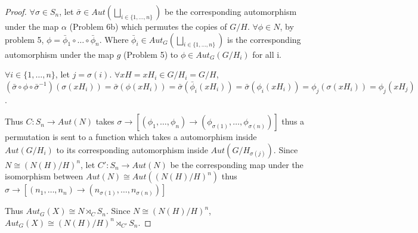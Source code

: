 \documentclass{article}
\begin{document}
\begin{proof}
    $\forall \sigma \in S_n$, let $\bar \sigma \in Aut(\bigsqcup_{i \in \{1, \ldots, n\}})$ be the corresponding automorphism under the map $\alpha$ (Problem 6b) which permutes the copies of $G/H$. $\forall \phi \in N$, by problem 5, $\phi = \bar \phi_1 \circ \ldots \circ \bar \phi_n$. Where $\bar \phi_i \in Aut_G(\bigsqcup_{i \in \{1, \ldots, n\}})$ is the corresponding automorphism under the map $g$ (Problem 5) to $\phi \in Aut_G(G/H_i)$ for all i.
    
    $\forall i \in \{1, \ldots, n\}$, let $j = \sigma(i)$. $\forall xH = xH_i \in G/H_i = G/H$, $(\bar \sigma \circ \phi \circ \bar \sigma^{-1})(\sigma(xH_i)) = \bar \sigma(\phi(xH_i)) = \bar \sigma(\bar \phi_i(xH_i)) = \bar \sigma(\phi_i(xH_i)) = \phi_j(\sigma(xH_i)) = \phi_j(xH_j)$.

    Thus $C: S_n \to Aut(N)$ takes $\sigma \to [(\phi_1, \ldots, \phi_n) \to (\phi_{\sigma(1)}, \ldots, \phi_{\sigma(n)})]$ thus a permutation is sent to a function which takes a automorphism inside $Aut(G/H_i)$ to its corresponding automorphism inside $Aut(G/H_{\sigma(j)})$. Since $N \cong (N(H)/H)^n$, let $C' : S_n \to Aut(N)$ be the corresponding map under the isomorphism between $Aut(N) \cong Aut((N(H)/H)^n)$ thus $\sigma \to [(n_1, \ldots, n_n) \to (n_{\sigma(1)}, \ldots, n_{\sigma(n)})]$

    Thus $Aut_G(X) \cong N \rtimes_{C} S_n$. Since $N \cong (N(H)/H)^n$, $Aut_G(X) \cong (N(H)/H)^n \rtimes_{C'} S_n$.

\end{proof}

\bigskip
\end{document}
